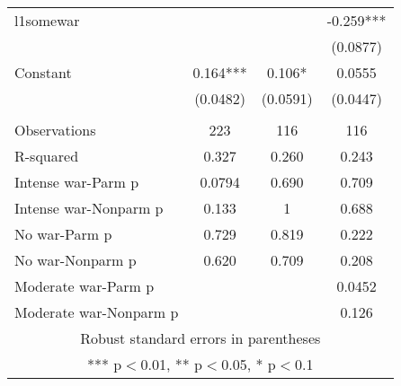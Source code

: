 \documentclass[]{article}
\begin{document}
\begin{tabular}{lccc}
l1somewar &  &  & -0.259*** \\
 &  &  & (0.0877) \\
Constant & 0.164*** & 0.106* & 0.0555 \\
 & (0.0482) & (0.0591) & (0.0447) \\
 &  &  &  \\
Observations & 223 & 116 & 116 \\
R-squared & 0.327 & 0.260 & 0.243 \\
Intense war-Parm p & 0.0794 & 0.690 & 0.709 \\
Intense war-Nonparm p & 0.133 & 1 & 0.688 \\
No war-Parm p & 0.729 & 0.819 & 0.222 \\
No war-Nonparm p & 0.620 & 0.709 & 0.208 \\
Moderate war-Parm p &  &  & 0.0452 \\
 Moderate war-Nonparm p &  &  & 0.126 \\ \hline
\multicolumn{4}{c}{ Robust standard errors in parentheses} \\
\multicolumn{4}{c}{ *** p$<$0.01, ** p$<$0.05, * p$<$0.1} \\
\end{tabular}
\end{document}
